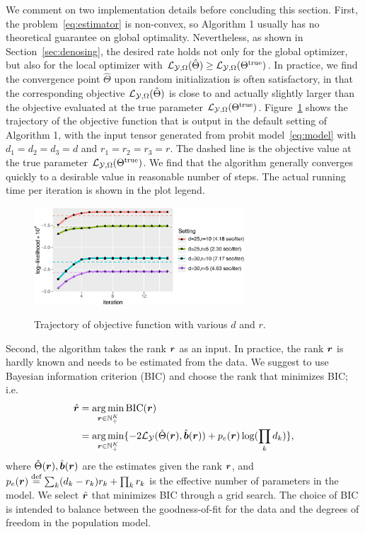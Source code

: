 \documentclass[11pt]{article}
\theoremstyle{plain}
\theoremstyle{definition}
\begin{document}
We comment on two implementation details before concluding this section. First, the problem~\eqref{eq:estimator} is non-convex, so Algorithm 1 usually has no theoretical guarantee on global optimality. Nevertheless, as shown in Section~\ref{sec:denosing}, the desired rate holds not only for the global optimizer, but also for the local optimizer with $\mathcal{L}_{\mathcal{Y},\Omega}(\hat \Theta)\geq \mathcal{L}_{\mathcal{Y},\Omega}(\Theta^{\mathrm{true}})$. In practice, we find the convergence point $\hat \Theta$ upon random initialization is often satisfactory, in that the corresponding objective $\mathcal{L}_{\mathcal{Y},\Omega}(\hat \Theta)$ is close to and actually slightly larger than the objective evaluated at the true parameter $\mathcal{L}_{\mathcal{Y},\Omega}(\Theta^{\mathrm{true}})$. Figure~\ref{fig:stability} shows the trajectory of the objective function that is output in the default setting of Algorithm 1, with the input tensor generated from probit model~\eqref{eq:model} with $d_1=d_2=d_3=d$ and $r_1=r_2=r_3=r$. The dashed line is the objective value at the true parameter $\mathcal{L}_{\mathcal{Y},\Omega}(\Theta^{\mathrm{true}})$. We find that the algorithm generally converges quickly to a desirable value in reasonable number of steps. The actual running time per iteration is shown in the plot legend.

\begin{figure}[H]
\centering
\includegraphics[width=0.7\textwidth]{algorithm.pdf}\label{fig:stability}
\caption{Trajectory of objective function with various $d$ and $r$.}
\end{figure}



Second, the algorithm takes the rank $\bm{r}$ as an input. In practice, the rank $\bm{r}$ is hardly known and needs to be estimated from the data. We suggest to use Bayesian information criterion (BIC) and choose the rank that minimizes BIC; i.e.
\begin{align}\label{eq:BIC}
\hat {\bm{r}}&=\operatorname*{arg\,min}_{\bm{r}\in\mathbb{N}^K_{+}} \text{BIC}(\bm{r})\\
&=\operatorname*{arg\,min}_{\bm{r}\in\mathbb{N}^K_{+}}\{-2\mathcal{L}_{\mathcal{Y}}(\hat \Theta(\bm{r}),\hat {\bm{b}}(\bm{r}))+p_e(\bm{r})\log (\prod_k d_k)\},
\end{align}
where $\hat \Theta(\bm{r}), \hat{\bm{b}}(\bm{r})$ are the estimates given the rank $\bm{r}$, and $p_e(\bm{r})\stackrel{\text{def}}{=}\sum_k (d_k-r_k)r_k+\prod_k r_k$ is the effective number of parameters in the model. We select $\hat {\bm{r}}$ that minimizes BIC through a grid search. The choice of BIC is intended to balance between the goodness-of-fit for the data and the degrees of freedom in the population model.
\end{document}
